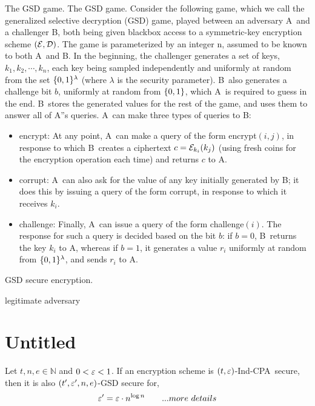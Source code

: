 \documentclass{article}
\newcommand{\tcpa}{$(t,\eps)$-Ind-CPA}
\def\B{{\sf B}}
\def\A{{\sf A}}
\def\E{{\cal E}}
\def\D{{\cal D}}
\newcommand{\encrypt}{{\sf encrypt}}
\def\corrupt{{\sf corrupt}}
\def\challenge{{\sf challenge}}
\begin{document}
\iffalse
The GSD game.
The GSD game. Consider the following game, which we call the generalized selective decryption
(GSD) game, played between an adversary \A~and a challenger \B, both being given blackbox
access to a symmetric-key encryption scheme $(\E,\D)$. The game is parameterized by an
integer n, assumed to be known to both \A~and \B. In the beginning, the challenger generates a
set of keys, $k_1, k_2, \cdots, k_n$, each key being sampled independently and uniformly at random from
the set $\{0,1\}^\lambda$ (where $\lambda$ is the security parameter). \B~also generates a challenge bit $b
$, uniformly
at random from $\{0,1\}$, which \A~is required to guess in the end. \B~stores the generated values
for the rest of the game, and uses them to answer all of  \A''s queries.
\A~can make three types of queries to \B:
\begin{itemize}
\item \encrypt: At any point, \A~can make a query of the form \encrypt$(i, j)$, in
response to which \B~creates a ciphertext $c=\E_{k_i} (k_j)$ (using fresh coins for
the encryption operation each time) and returns $c$ to \A.
\item \corrupt: \A~can also ask for the value of any key initially generated by \B; it
does this by issuing a query of the form \corrupt, in response to which it
receives $k_i$.
\item \challenge: Finally, \A~can issue a query of the form \challenge$(i)$. The
response for such a query is decided based on the bit $b$: if $b = 0$, \B~returns
the key $k_i$ to \A, whereas if $b = 1$, it generates a value $r_i$ uniformly at random
from $\{0,1\}^\lambda$, and sends $r_i$ to \A.

\end{itemize}
\begin{definition} 
 GSD secure encryption.
\end{definition}

\begin{definition} 
legitimate adversary 
\end{definition}
\section{Untitled}
\begin{theorem}
 Let $t,n,e \in \mathbb{N}$  and $0<\varepsilon<1$. If an encryption scheme is \tcpa~secure, then it is also $(t',\varepsilon',n,e)$-GSD secure for,
 \[\varepsilon'=\varepsilon\cdot n^{\log n} \qquad ... more~details\]
\end{theorem}
\end{document}
